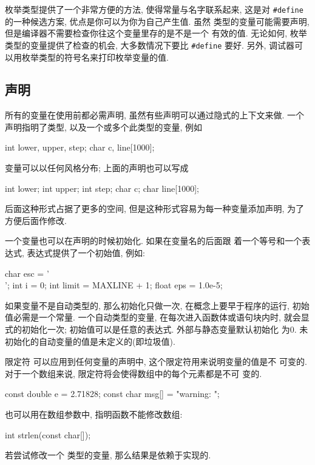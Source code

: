 枚举类型提供了一个非常方便的方法, 使得常量与名字联系起来, 这是对 
\verb"#define" 的一种候选方案, 优点是你可以为你为自己产生值. 虽然 \cenum 
类型的变量可能需要声明, 但是编译器不需要检查你往这个变量里存的是不是一个
有效的值. 无论如何, 枚举类型的变量提供了检查的机会, 大多数情况下要比
\verb"#define" 要好. 另外, 调试器可以用枚举类型的符号名来打印枚举变量的值.

\subsection{声明}
所有的变量在使用前都必需声明, 虽然有些声明可以通过隐式的上下文来做. 一个 
声明指明了类型, 以及一个或多个此类型的变量, 例如 
\begin{myverbatim}
    int lower, upper, step;
    char c, line[1000];
\end{myverbatim}
变量可以以任何风格分布; 上面的声明也可以写成
\begin{myverbatim}
    int lower;
    int upper;
    int step;
    char c;
    char line[1000];
\end{myverbatim}
后面这种形式占据了更多的空间, 但是这种形式容易为每一种变量添加声明, 为了 
方便后面作修改.

一个变量也可以在声明的时候初始化. 如果在变量名的后面跟 着一个等号和一个表
达式, 表达式提供了一个初始值, 例如:
\begin{myverbatim}
    char esc = '\\';
    int  i = 0;
    int  limit = MAXLINE + 1;
    float eps = 1.0e-5;
\end{myverbatim}
如果变量不是自动类型的, 那么初始化只做一次, 在概念上要早于程序的运行,
初始值必需是一个常量. 一个自动类型的变量, 在每次进入函数体或语句块内时, 
就会显式的初始化一次; 初始值可以是任意的表达式. 外部与静态变量默认初始化
为0. 未初始化的自动变量的值是未定义的(即垃圾值).

限定符 \cconst 可以应用到任何变量的声明中, 这个限定符用来说明变量的值是不
可变的. 对于一个数组来说, \cconst 限定符将会使得数组中的每个元素都是不可
变的.
\begin{myverbatim}
    const double e = 2.71828;
    const char msg[] = "warning: ";
\end{myverbatim}
\cconst 也可以用在数组参数中, 指明函数不能修改数组:
\begin{myverbatim}
    int strlen(const char[]);
\end{myverbatim}
若尝试修改一个 \cconst 类型的变量, 那么结果是依赖于实现的.

